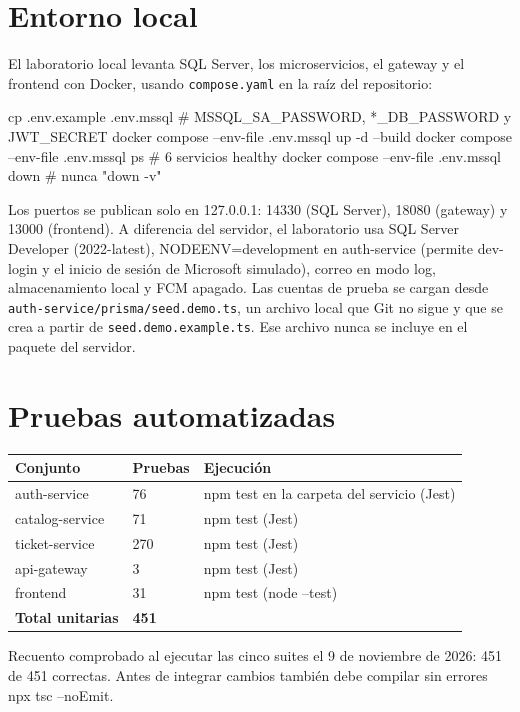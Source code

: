 \documentclass[11pt,a4paper,oneside]{report}
\newcommand{\codus}{\textunderscore\allowbreak}
\DeclareRobustCommand{\cod}[1]{{\small\ttfamily\let\_\codus #1}}
\DeclareRobustCommand{\ruta}[1]{{\small\nolinkurl{#1}}}
\newcommand{\cabecera}{\rowcolor{utaRojo!12}}
\begin{document}
\section{Entorno local}
El laboratorio local levanta SQL Server, los microservicios, el gateway y el frontend con Docker,
usando \ruta{compose.yaml} en la raíz del repositorio:
\begin{bash}
cp .env.example .env.mssql      # MSSQL_SA_PASSWORD, *_DB_PASSWORD y JWT_SECRET
docker compose --env-file .env.mssql up -d --build
docker compose --env-file .env.mssql ps      # 6 servicios healthy
docker compose --env-file .env.mssql down    # nunca "down -v"
\end{bash}
Los puertos se publican solo en \cod{127.0.0.1}: 14330 (SQL Server), 18080 (gateway) y 13000 (frontend).
A diferencia del servidor, el laboratorio usa SQL Server Developer (\cod{2022-latest}),
\cod{NODE\_ENV=development} en auth-service (permite \cod{dev-login} y el inicio de sesión de Microsoft simulado),
correo en modo \cod{log}, almacenamiento local y FCM apagado.
Las cuentas de prueba se cargan desde \ruta{auth-service/prisma/seed.demo.ts}, un archivo local que
Git no sigue y que se crea a partir de \ruta{seed.demo.example.ts}. Ese archivo nunca se incluye en el paquete del servidor.

\section{Pruebas automatizadas}
\begin{center}
\begin{tabularx}{\linewidth}{@{}P{4.6cm}P{2.0cm}L@{}}
\toprule
\cabecera \textbf{Conjunto} & \textbf{Pruebas} & \textbf{Ejecución} \\
\midrule
auth-service & 76 & \cod{npm test} en la carpeta del servicio (Jest) \\
catalog-service & 71 & \cod{npm test} (Jest) \\
ticket-service & 270 & \cod{npm test} (Jest) \\
api-gateway & 3 & \cod{npm test} (Jest) \\
frontend & 31 & \cod{npm test} (\cod{node --test}) \\
\midrule
\textbf{Total unitarias} & \textbf{451} & \\
\bottomrule
\end{tabularx}
\end{center}
Recuento comprobado al ejecutar las cinco suites el 9 de noviembre de 2026: 451 de 451 correctas.
Antes de integrar cambios también debe compilar sin errores \cod{npx tsc --noEmit}.
\end{document}
